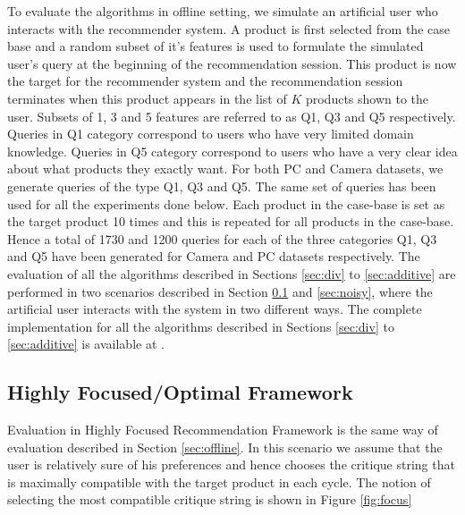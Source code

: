 To evaluate the algorithms in offline setting, we simulate an artificial user who interacts with the recommender system.
A product is first selected from the case base and a random subset of it's features is used to formulate the simulated user's query at the beginning of the recommendation session.
This product is now the target for the recommender system and the recommendation session terminates when this product appears in the list of $K$ products shown to the user. 
Subsets of 1, 3 and 5 features are referred to as Q1, Q3 and Q5 respectively.
Queries in Q1 category correspond to users who have very limited domain knowledge.
Queries in Q5 category correspond to users who have a very clear idea about what products they exactly want.
For both PC and Camera datasets, we generate queries of the type Q1, Q3 and Q5.
The same set of queries has been used for all the experiments done below.
Each product in the case-base is set as the target product 10 times and this is repeated for all products in the case-base.
Hence a total of 1730 and 1200 queries for each of the three categories Q1, Q3 and Q5 have been generated for Camera and PC datasets respectively.
The evaluation of all the algorithms described in Sections \ref{sec:div} to \ref{sec:additive} are performed in two scenarios described in Section \ref{sec:focus} and \ref{sec:noisy}, where the artificial user interacts with the system in two different ways.
The complete implementation for all the algorithms described in Sections \ref{sec:div} to \ref{sec:additive} is available at 
\cite{implementation}.

\subsection{Highly Focused/Optimal Framework}
\label{sec:focus}
Evaluation in Highly Focused Recommendation Framework is the same way of evaluation described in Section \ref{sec:offline}.
In this scenario we assume that the user is relatively sure of his preferences and hence chooses the critique string that is maximally compatible with the target product in each cycle.
The notion of selecting the most compatible critique string is shown in Figure \ref{fig:focus}

